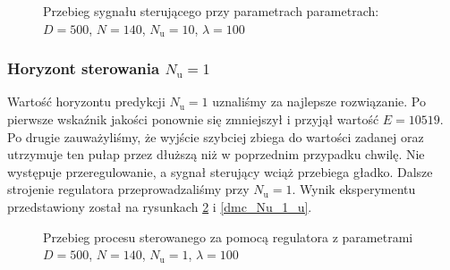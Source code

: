 \begin{figure}[b]
    \centering
    \caption{Przebieg sygnału sterującego przy parametrach parametrach: $D = 500$, $N = 140$, $N_{\mathrm{u}} = 10$, $\lambda = 100$}
    \label{dmc_Nu_10_u}
\end{figure}

\subsubsection{Horyzont sterowania $N_{\mathrm{u}} = 1$}
Wartość horyzontu predykcji $N_{\mathrm{u}} = 1$ uznaliśmy za najlepsze rozwiązanie. Po pierwsze wskaźnik jakości ponownie się zmniejszył i przyjął wartość $E = \num{10519}$. Po drugie zauważyliśmy, że wyjście szybciej zbiega do wartości zadanej oraz utrzymuje ten pułap przez dłuższą niż w poprzednim przypadku chwilę. Nie występuje przeregulowanie, a sygnał sterujący wciąż przebiega gładko. Dalsze strojenie regulatora przeprowadzaliśmy przy $N_{\mathrm{u}} = 1$. Wynik eksperymentu przedstawiony został na rysunkach \ref{dmc_Nu_1_y} i \ref{dmc_Nu_1_u}.

\begin{figure}[t]
    \centering
    \caption{Przebieg procesu sterowanego za pomocą regulatora z parametrami $D = 500$, $N = 140$, $N_{\mathrm{u}} = 1$, $\lambda = 100$}
    \label{dmc_Nu_1_y}
\end{figure}

